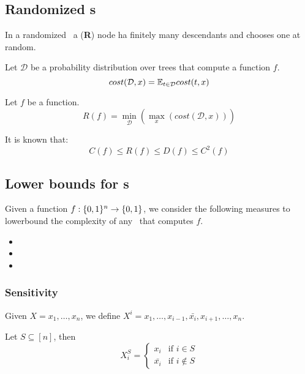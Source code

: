 \subsection{Randomized \dt s}\label{subsec:rand_dt}
    \def\rdt{\textbf{R}\dt}
    \def\distrib{\mathcal{D}}

    In a randomized \dt~a (\rdt) node ha finitely many descendants and chooses one at random.

    Let $\distrib$ be a probability distribution over trees that compute a function $f$.
    \[ cost(\distrib,x) = \expected_{t \in \distrib} cost(t,x) \]

    \begin{definition}[Cost of an \rdt]\label{def:cost_rdt}
        Let $f$ be a function.
        \[ R(f) = \min_{\distrib} (\max_x (cost(\distrib, x))) \]
    \end{definition}

    It is known that:
    \[ C(f) \leq R(f) \leq D(f) \leq C^2(f) \]


\subsection{Lower bounds for \dt s}\label{subsec:dt_lowerbound}

    Given a function $f : \{ 0,1 \}^n \rightarrow \{ 0,1 \}$, we consider the following measures to lowerbound the complexity of any \dt~that computes $f$.
    \begin{itemize}
        \item {}
        \item {}
        \item {}
    \end{itemize}

    \subsubsection{Sensitivity}\label{subsubsec:sensitivity}
        Given $X = x_1, \dots, x_n$, we define $X^i = x_1, \dots, x_{i-1}, \bar{x_i}, x_{i+1}, \dots, x_n$.

        Let $S \subseteq [n]$, then
        \begin{equation}\label{eq:sensitivity}
            X_i^S = 
            \begin{cases}
                x_i         & \text{if } i \in S\\
                \bar{x_i}   & \text{if } i \not\in S
            \end{cases}
        \end{equation}

